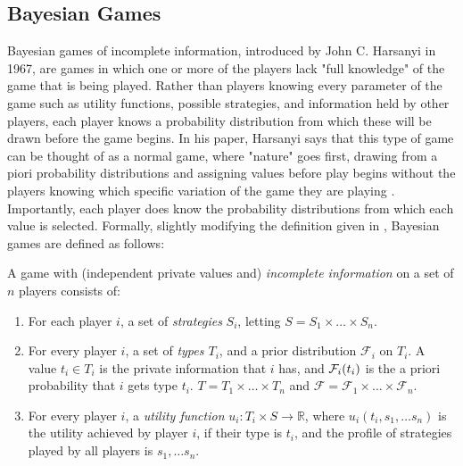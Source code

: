 \documentclass[12pt,twoside]{reedthesis}
\begin{document}
\subsection{Bayesian Games}
Bayesian games of incomplete information, introduced by John C. Harsanyi in 1967, are games in which one or more of the players lack "full knowledge" of the game that is being played. Rather than players knowing every parameter of the game such as utility functions, possible strategies, and information held by other players, each player knows a probability distribution from which these will be drawn before the game begins. In his paper, Harsanyi says that this type of game can be thought of as a normal game, where "nature" goes first, drawing from a piori probability distributions and assigning values before play begins without the players knowing which specific variation of the game they are playing \citep[159]{Harsanyi1967}.
Importantly, each player does know the probability distributions from which each value is selected. Formally, slightly modifying the definition given in \citet{Nisan2007}, Bayesian games are defined as follows:

\begin{dfn}
	A game with (independent private values and) \textit{incomplete information} on a set of $n$ players consists of:
	\begin{enumerate}
		\item For each player $i$, a set of {\em strategies} $S_i$, letting $S = S_1 \times \ldots \times S_n$.
		\item For every player $i$, a set of {\em types $T_i$}, and a prior distribution $\mathcal{F}_i$ on $T_i$. A value $t_i \in T_i$ is the private information that $i$ has, and $\mathcal{F}_i(t_i)$ is the a priori probability that $i$ gets type $t_i$. $T = T_1 \times \ldots \times T_n$ and $\mathcal{F} = \mathcal{F}_1 \times \ldots \times \mathcal{F}_n$.
		\item For every player $i$, a \textit{utility function} $u_i : T_i \times S \rightarrow \mathbb{R}$, where $u_i(t_i, s_1, \ldots s_n)$ is the utility achieved by player $i$, if their type is $t_i$, and the profile of strategies played by all players is $s_1, \ldots s_n$.
	\end{enumerate} 
\label{dfn:BayesianGame}
\end{dfn}
\end{document}
